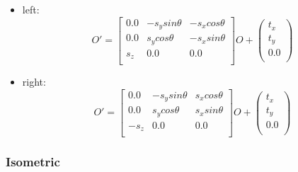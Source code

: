 \begin{itemize}
\begin{equation}
\begin{array}{ccc}
s_xcos\theta&0.0&s_ysin\theta\\
s_xsin\theta&0.0&-s_ycos\theta\\
0.0&s_z&0.0\\
\end{array}
\right]O+\left(
\begin{array}{c}
t_x\\
t_y\\
0.0\\
\end{array}\right)
\end{equation}
\item left:\\
\begin{equation}
O'=\left[\begin{array}{ccc}
0.0&-s_ysin\theta&-s_xcos\theta\\
0.0&s_ycos\theta&-s_xsin\theta\\
s_z&0.0&0.0\\
\end{array}
\right]O+\left(
\begin{array}{c}
t_x\\
t_y\\
0.0\\
\end{array}\right)
\end{equation}
\item right:\\
\begin{equation}
O'=\left[\begin{array}{ccc}
0.0&-s_ysin\theta&s_xcos\theta\\
0.0&s_ycos\theta&s_xsin\theta\\
-s_z&0.0&0.0\\
\end{array}
\right]O+\left(
\begin{array}{c}
t_x\\
t_y\\
0.0\\
\end{array}\right)
\end{equation}
\end{itemize}

\subsubsection{Isometric}

